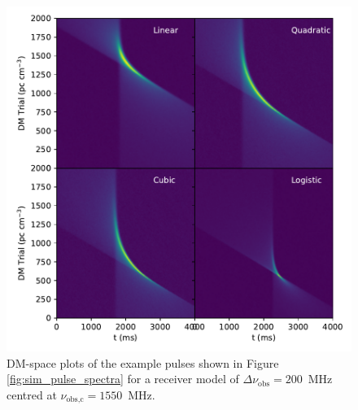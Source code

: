 \documentclass[a4paper,fleqn,usenatbib]{mnras}
\begin{document}
\begin{figure}
    \includegraphics[width=1.0\linewidth]{figures/sim_dmtrials.pdf}
    \caption{DM-space plots of the example pulses shown in Figure
    \ref{fig:sim_pulse_spectra} for a receiver model of $\Delta
    \nu_{\textrm{obs}} = 200$~MHz centred at $\nu_{\textrm{obs,c}} = 1550$~MHz.
    }
    \label{fig:sim_dmtrials}
\end{figure}
\end{document}

